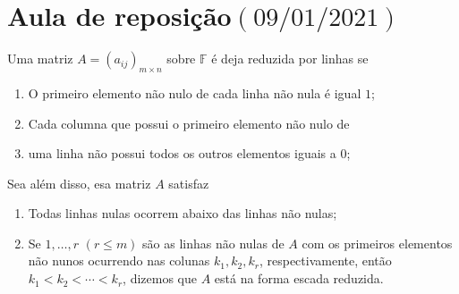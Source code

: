 \chapter{Aula de reposição\quad$\left(09/01/2021\right)$}

\begin{definition}
  Uma matriz $A={\left(a_{ij}\right)}_{m\times n}$ sobre $\mathbb{F}$
  é deja reduzida por linhas se
  \begin{enumerate}
    \item

          O primeiro elemento não nulo de cada linha não nula é
          igual $1$;

    \item

          Cada columna que possui o primeiro elemento não nulo de

    \item

          uma linha não possui todos os outros elementos iguais a
          $0$;
  \end{enumerate}


  Sea além disso, esa matriz $A$ satisfaz

  \begin{enumerate}

    \item

          Todas linhas nulas ocorrem abaixo das linhas não nulas;

    \item

          Se $1,\ldots,r$ $\left(r\leq m\right)$ são as linhas não
          nulas de $A$ com os primeiros elementos não nunos ocurrendo
          nas colunas $k_{1},k_{2},k_{r}$, respectivamente, então
          $k_{1}<k_{2}<\cdots<k_{r}$, dizemos que $A$ está na forma
          escada reduzida.
  \end{enumerate}
\end{definition}


